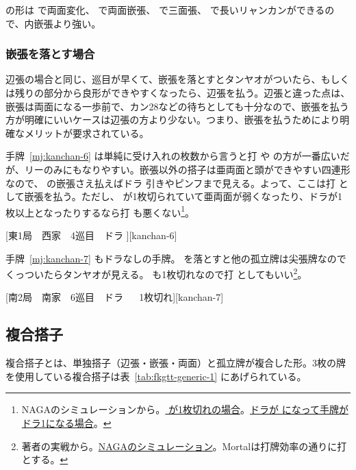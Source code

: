 \documentclass[../nankiru_main.tex]{subfiles}
\begin{document}
 の形は  で両面変化、 で両面嵌張、 で三面張、 で長いリャンカンができるので、内嵌張より強い。


\subsubsection*{嵌張を落とす場合}

辺張の場合と同じ、巡目が早くて、嵌張を落とすとタンヤオがついたら、もしくは残りの部分から良形ができやすくなったら、辺張を払う。辺張と違った点は、嵌張は両面になる一歩前で、カン28などの待ちとしても十分なので、嵌張を払う方が明確にいいケースは辺張の方より少ない。つまり、嵌張を払うためにより明確なメリットが要求されている。

手牌~\ref{mj:kanchan-6} は単純に受け入れの枚数から言うと打  や  の方が一番広いだが、リーのみにもなりやすい。嵌張以外の搭子は亜両面と頭ができやすい四連形なので、 の嵌張さえ払えばドラ  引きやピンフまで見える。よって、ここは打  として嵌張を払う\citep[][p.~34]{uzaku-nankiru}。ただし、 が1枚切られていて亜両面が弱くなったり、ドラが1枚以上となったりするなら打  も悪くない\footnote{NAGAのシミュレーションから。\href{https://naga.dmv.nico/htmls/bdf8d26d2651506193dbb5cf0a6e1f389c6f755f502aad355a06baa93e74e94av2_2.html?tw=2}{ が1枚切れの場合}。\href{https://naga.dmv.nico/htmls/1a073840dca2d981ab6fe78fee1e21397a86488a24a7c570746837e2af44a268v2_2.html?tw=0}{ドラが  になって手牌がドラ1になる場合}。}。

[東1局　西家　4巡目　ドラ ][kanchan-6]

手牌~\ref{mj:kanchan-7} もドラなしの手牌。 を落とすと他の孤立牌は尖張牌なのでくっついたらタンヤオが見える。 も1枚切れなので打  としてもいい\footnote{著者の実戦から。\href{https://naga.dmv.nico/htmls/b1ce439d70b8dfc48152e539f75e29d57763308a9de1dfafc95f65a9529f2757v2_2.html?tw=2}{NAGAのシミュレーション}。Mortalは打牌効率の通りに打  とする。}。

[南2局　南家　6巡目　ドラ 　 1枚切れ][kanchan-7]


\subsection{複合搭子} \label{sec:complex-shape}

複合搭子とは、単独搭子（辺張・嵌張・両面）と孤立牌が複合した形。3枚の牌を使用している複合搭子は表~\ref{tab:fkgtt-generic-1} にあげられている。
\end{document}
